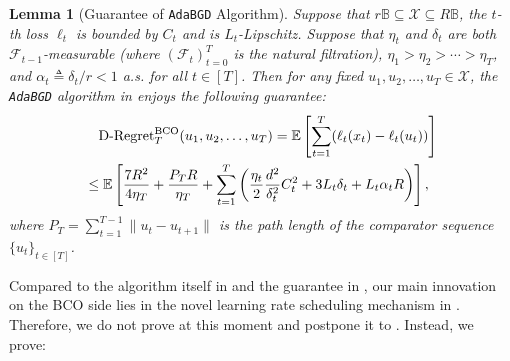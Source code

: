 \documentclass[11pt,fullpage,letterpaper]{article} %
\newtheorem{lemma}[theorem]{Lemma}
\renewcommand{\bm}[1]{#1}%
\newcommand{\E}{\operatornamewithlimits{\mathbb{E}}}
\newcommand{\BCOAlg}{\texttt{AdaBGD}\xspace}
\begin{document}
\begin{lemma}[Guarantee of \BCOAlg Algorithm]\label{lem:ABGD guarantee}
Suppose that $r\mathbb B\subseteq \mathcal X\subseteq R\mathbb B$, the $t$-th loss $\ell_t$ is bounded by $C_t$ and is $L_t$-Lipschitz.
Suppose that $\eta_t$ and $\delta_t$ are both $\mathcal F_{t-1}$-measurable (where $(\mathcal F_t)_{t=0}^T$ is the natural filtration), $\eta_1>\eta_2>\cdots>\eta_T$, and $\alpha_t\triangleq \delta_t / r<1$ \textit{a.s.} for all $t\in [T]$. Then for any fixed $\bm u_1,\bm u_2,\ldots,\bm u_T\in \mathcal X$, the \BCOAlg algorithm in  enjoys the following guarantee:
\begin{align*}
&\quad \text{D-Regret}_T^{\text{BCO}}(\bm u_1,\bm u_2,\ldots,\bm u_T)=\E\left [\sum_{t=1}^T (\ell_t(\bm x_t)-\ell_t(\bm u_t))\right ]\\
&\le \E\left [\frac{7R^2}{4\eta_T}+\frac{P_T R}{\eta_T}+\sum_{t=1}^T \left (\frac{\eta_t}{2} \frac{d^2}{\delta_t^2} C_t^2 + 3L_t \delta_t + L_t \alpha_t R\right )\right ],
\end{align*}
where $P_T=\sum_{t=1}^{T-1}\lVert \bm u_t-\bm u_{t+1}\rVert$ is the path length of the comparator sequence $\{\bm u_t\}_{t\in [T]}$.
\end{lemma}

Compared to the algorithm itself in  and the guarantee in , our main innovation on the BCO side lies in the novel learning rate scheduling mechanism in .
Therefore, we do not prove  at this moment and postpone it to .
Instead, we prove:
\end{document}
